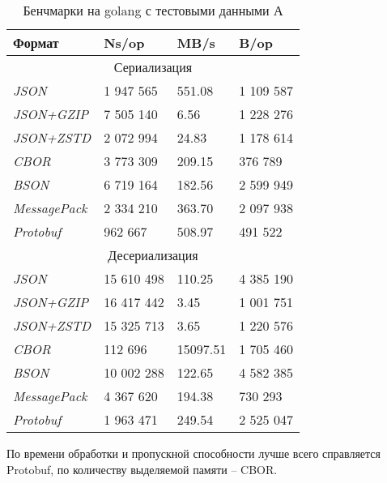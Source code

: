 \begin{table}[ht!]
\centering
\caption{Бенчмарки на golang с тестовыми данными А}
\begin{tabular}{|l|l|l|l|} 
\hline
\textbf{Формат}      & \textbf{Ns/op} & \textbf{MB/s} & \textbf{B/op}  \\ 
\hline
\multicolumn{4}{|c|}{Сериализация}                                        \\ 
\hline
\textit{JSON}        & 1 947 565        & 551.08        & 1 109 587        \\ 
\hline
\textit{JSON+GZIP}   & 7 505 140        & 6.56          & 1 228 276        \\ 
\hline
\textit{JSON+ZSTD}   & 2 072 994        & 24.83         & 1 178 614        \\ 
\hline
\textit{CBOR}        & 3 773 309        & 209.15        & 376 789         \\ 
\hline
\textit{BSON}        & 6 719 164        & 182.56        & 2 599 949        \\ 
\hline
\textit{MessagePack} & 2 334 210        & 363.70        & 2 097 938        \\ 
\hline
\textit{Protobuf}    & 962 667         & 508.97        & 491 522         \\ 
\hline
\multicolumn{4}{|c|}{Десериализация}                                      \\ 
\hline
\textit{JSON}        & 15 610 498       & 110.25        & 4 385 190        \\ 
\hline
\textit{JSON+GZIP}   & 16 417 442       & 3.45          & 1 001 751        \\ 
\hline
\textit{JSON+ZSTD}   & 15 325 713       & 3.65          & 1 220 576        \\ 
\hline
\textit{CBOR}        & 112 696         & 15097.51      & 1 705 460        \\ 
\hline
\textit{BSON}        & 10 002 288       & 122.65        & 4 582 385        \\ 
\hline
\textit{MessagePack} & 4 367 620        & 194.38        & 730 293         \\ 
\hline
\textit{Protobuf}    & 1 963 471        & 249.54        & 2 525 047        \\
\hline
\end{tabular}
\end{table}

По времени обработки и пропускной способности лучше всего справляется Protobuf, по количеству выделяемой памяти -- CBOR.  
\clearpage

